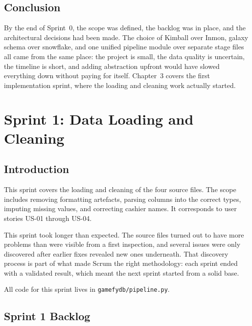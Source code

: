 \documentclass[12pt, a4paper]{report}
\begin{document}
\section{Conclusion}

By the end of Sprint~0, the scope was defined, the backlog was in place,
and the architectural decisions had been made. The choice of Kimball over
Inmon, galaxy schema over snowflake, and one unified pipeline module over
separate stage files all came from the same place: the project is small,
the data quality is uncertain, the timeline is short, and adding abstraction
upfront would have slowed everything down without paying for itself.
Chapter~3 covers the first implementation sprint, where the loading and
cleaning work actually started.

\chapter{Sprint 1: Data Loading and Cleaning}

\section{Introduction}

This sprint covers the loading and cleaning of the four source files. The scope
includes removing formatting artefacts, parsing columns into the correct types,
imputing missing values, and correcting cashier names. It corresponds to user
stories US-01 through US-04.

This sprint took longer than expected. The source files turned out to have more
problems than were visible from a first inspection, and several issues were only
discovered after earlier fixes revealed new ones underneath. That discovery process
is part of what made Scrum the right methodology: each sprint ended with a validated
result, which meant the next sprint started from a solid base.

All code for this sprint lives in \texttt{gamefydb/pipeline.py}.

\section{Sprint 1 Backlog}
\end{document}

